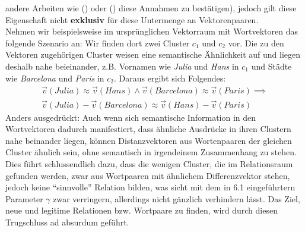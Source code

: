 \begin{itemize}
  andere Arbeiten wie (\cite{bordes2013translating}) oder (\cite{lin2015learning}) diese Annahmen zu bestätigen), jedoch
  gilt diese Eigenschaft nicht \textbf{exklusiv} für diese Untermenge an Vektorenpaaren.\\
  Nehmen wir beispielsweise im ursprünglichen Vektorraum mit Wortvektoren das folgende Szenario an: Wir finden dort
  zwei Cluster $c_1$ und $c_2$ vor. Die zu den Vektoren zugehörigen Cluster weisen eine semantische Ähnlichkeit auf
  und liegen deshalb nahe beieinander, z.B. Vornamen wie \emph{Julia} und \emph{Hans} in $c_1$ und Städte wie
  \emph{Barcelona} und \emph{Paris} in $c_2$. Daraus ergibt sich Folgendes:
  \begin{equation}
    \begin{split}
      \vec{v}(Julia) \approx \vec{v}(Hans) \land \vec{v}(Barcelona) \approx \vec{v}(Paris) \implies \\
      \vec{v}(Julia) - \vec{v}(Barcelona) \approx \vec{v}(Hans) - \vec{v}(Paris)
    \end{split}
  \end{equation}
  Anders ausgedrückt: Auch wenn sich semantische Information in den Wortvektoren dadurch manifestiert, dass ähnliche
  Ausdrücke in ihren Clustern nahe beinander liegen, können Distanzvektoren aus Wortenpaaren der gleichen Cluster ähnlich sein,
  ohne semantisch in irgendeinem Zusammenhang zu stehen. Dies führt schlussendlich dazu, dass die wenigen Cluster, die
  im Relationsraum gefunden werden, zwar aus Wortpaaren mit ähnlichem Differenzvektor stehen, jedoch keine ``sinnvolle''
  Relation bilden, was sicht mit dem in 6.1 eingeführtern Parameter $\gamma$ zwar verringern, allerdings nicht gänzlich
  verhindern lässt. Das Ziel, neue und legitime Relationen bzw. Wortpaare zu finden, wird durch diesen Trugschluss ad absurdum geführt.


\end{itemize}
